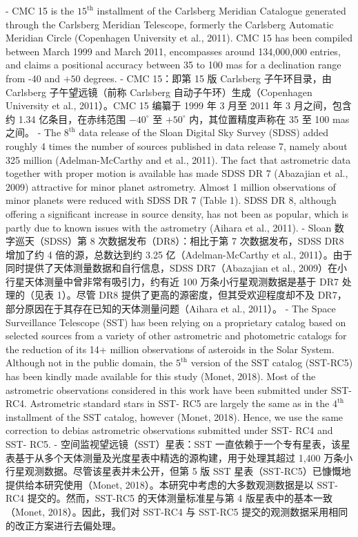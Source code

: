 - CMC 15 is the  $15^{\text{th}}$  installment of the Carlsberg Meridian Catalogue generated through the Carlsberg Meridian Telescope, formerly the Carlsberg Automatic Meridian Circle (Copenhagen University et al., 2011). CMC 15 has been compiled between March 1999 and March 2011, encompasses around 134,000,000 entries, and claims a positional accuracy between 35 to 100 mas for a declination range from -40 and  $+50$  degrees.
- CMC 15：即第 15 版 Carlsberg 子午环目录，由 Carlsberg 子午望远镜（前称 Carlsberg 自动子午环）生成（Copenhagen University et al., 2011）。CMC 15 编纂于 1999 年 3 月至 2011 年 3 月之间，包含约 1.34 亿条目，在赤纬范围 $-40^\circ$ 至 $+50^\circ$ 内，其位置精度声称在 35 至 100 mas 之间。
- The  $8^{\text{th}}$  data release of the Sloan Digital Sky Survey (SDSS) added roughly 4 times the number of sources published in data release 7, namely about 325 million (Adelman-McCarthy and et al., 2011). The fact that astrometric data together with proper motion is available has made SDSS DR 7 (Abazajian et al., 2009) attractive for minor planet astrometry. Almost 1 million observations of minor planets were reduced with SDSS DR 7 (Table 1). SDSS DR 8, although offering a significant increase in source density, has not been as popular, which is partly due to known issues with the astrometry (Aihara et al., 2011).
- Sloan 数字巡天（SDSS）第 8 次数据发布（DR8）：相比于第 7 次数据发布，SDSS DR8 增加了约 4 倍的源，总数达到约 3.25 亿（Adelman-McCarthy et al., 2011）。由于同时提供了天体测量数据和自行信息，SDSS DR7（Abazajian et al., 2009）在小行星天体测量中曾非常有吸引力，约有近 100 万条小行星观测数据是基于 DR7 处理的（见表 1）。尽管 DR8 提供了更高的源密度，但其受欢迎程度却不及 DR7，部分原因在于其存在已知的天体测量问题（Aihara et al., 2011）。
- The Space Surveillance Telescope (SST) has been relying on a proprietary catalog based on selected sources from a variety of other astrometric and photometric catalogs for the reduction of its 14+ million observations of asteroids in the Solar System. Although not in the public domain, the  $5^{\text{th}}$  version of the SST catalog (SST-RC5) has been kindly made available for this study (Monet, 2018). Most of the astrometric observations considered in this work have been submitted under SST-RC4. Astrometric standard stars in SST- RC5 are largely the same as in the  $4^{\text{th}}$  installment of the SST catalog, however (Monet, 2018). Hence, we use the same correction to debias astrometric observations submitted under SST- RC4 and SST- RC5.
- 空间监视望远镜（SST）星表：SST 一直依赖于一个专有星表，该星表基于从多个天体测量及光度星表中精选的源构建，用于处理其超过 1,400 万条小行星观测数据。尽管该星表并未公开，但第 5 版 SST 星表（SST-RC5）已慷慨地提供给本研究使用（Monet, 2018）。本研究中考虑的大多数观测数据是以 SST-RC4 提交的。然而，SST-RC5 的天体测量标准星与第 4 版星表中的基本一致（Monet, 2018）。因此，我们对 SST-RC4 与 SST-RC5 提交的观测数据采用相同的改正方案进行去偏处理。
